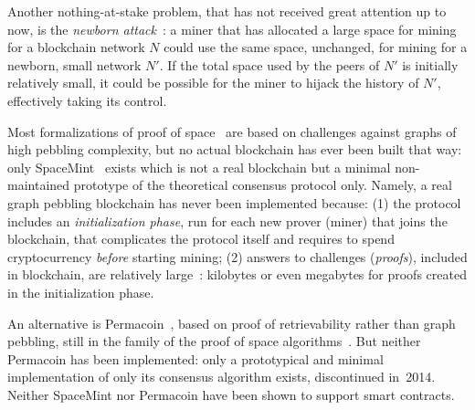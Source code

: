 Another nothing-at-stake problem, that has not received great attention up to now,
is the \emph{newborn attack}~\cite{TangZDWLG0L19}: a miner that has allocated a large space
for mining for a blockchain network $N$ could use the same space, unchanged, for
mining for a newborn, small network $N'$. If the total space used by the peers of $N'$ is
initially relatively small, it could be possible for the miner to hijack the history of $N'$,
effectively taking its control.

Most formalizations of proof of space~\cite{AtenieseBFG14,DziembowskiFKP15,RenD16} are
based on challenges against graphs of high pebbling complexity, but
no actual blockchain has ever been built that way: only SpaceMint~\cite{ParkKFGAP18} exists
which is not a real blockchain but a minimal non-maintained prototype
of the theoretical consensus protocol only. Namely, a real graph pebbling blockchain has
never been implemented because:
%
(1) the protocol includes an \emph{initialization phase},
  run for each new prover (miner) that joins the blockchain,
  that complicates the protocol itself and
  requires to spend cryptocurrency \emph{before}
  starting mining;
(2) answers to challenges (\emph{proofs}),
  included in blockchain, are relatively large~\cite{AbusalahACKPR17}:
  kilobytes or even megabytes for proofs created in the initialization phase.

An alternative is Permacoin~\cite{MillerJSPK14}, based on proof of retrievability rather than
graph pebbling, still in the family of the proof of space algorithms~\cite{RenD16}.
But neither Permacoin has been implemented: only a prototypical and minimal implementation
of only its consensus algorithm exists, discontinued in~2014. Neither SpaceMint nor Permacoin
have been shown to support smart contracts.

